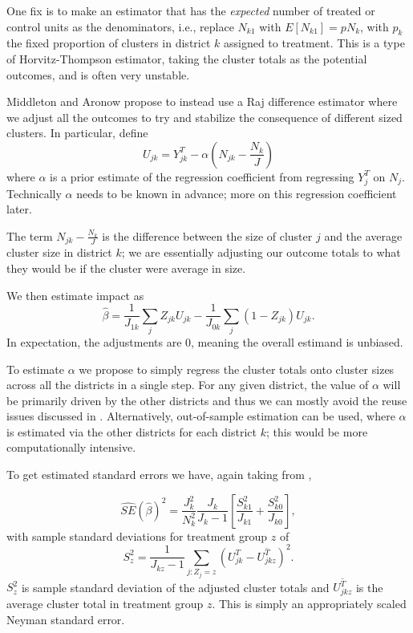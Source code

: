 \documentclass[12pt]{article}
\begin{document}
One fix is to make an estimator that has the \emph{expected} number of treated or control units as the denominators, i.e., replace $N_{k1}$ with $E[ N_{k1} ] = p N_k$, with $p_k$ the fixed proportion of clusters in district $k$ assigned to treatment.
This is a type of Horvitz-Thompson estimator, taking the cluster totals as the potential outcomes, and is often very unstable.

Middleton and Aronow propose to instead use a Raj difference estimator where we adjust all the outcomes to try and stabilize the consequence of different sized clusters.
In particular, define
$$ U_{jk} = Y^T_{jk} - \alpha\left( N_{jk} - \frac{N_k}{J}\right) $$
where $\alpha$ is a prior estimate of the regression coefficient from regressing $Y_j^T$ on $N_j$.
Technically $\alpha$ needs to be known in advance; more on this regression coefficient later.

The term $N_{jk} - \frac{N_k}{J}$ is the difference between the size of cluster $j$ and the average cluster size in district $k$; we are essentially adjusting our outcome totals to what they would be if the cluster were average in size.

We then estimate impact as
\[
\hat{\beta} = \frac{1}{J_{1k}} \sum_j Z_{jk} U_{jk} -  \frac{1}{J_{0k}} \sum_j (1-Z_{jk}) U_{jk}.
\]
In expectation, the adjustments are 0, meaning the overall estimand is unbiased.

To estimate $\alpha$ we propose to simply regress the cluster totals onto cluster sizes across all the districts in a single step.
For any given district, the value of $\alpha$ will be primarily driven by the other districts and thus we can mostly avoid the reuse issues discussed in \citep{Middleton_clusterRCT}.
Alternatively, out-of-sample estimation can be used, where $\alpha$ is estimated via the other districts for each district $k$; this would be more computationally intensive.

To get estimated standard errors we have, again taking from \citep{Middleton_clusterRCT},

\[
\widehat{SE}(\hat{\beta})^2 = \frac{J_k^2}{N_k^2} \frac{J_k}{J_k-1} \left[ \frac{ S^2_{k1}} {J_{k1} } + \frac{ S^2_{k0} }{J_{k0}} \right],
\]
with sample standard deviations for treatment group $z$ of
\[
S^2_z = \frac{1}{J_{kz} - 1} \sum_{j : Z_j = z} \left( U_{jk}^T - \overline{U_{jkz}^T} \right)^2 .
\]
$S_z^2$ is sample standard deviation of the adjusted cluster totals and $\overline{U_{jkz}^T}$ is the average cluster total in treatment group $z$.
This is simply an appropriately scaled Neyman standard error.






{}
\end{document}
